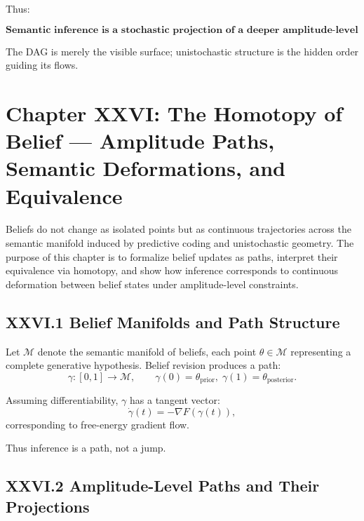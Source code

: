 \documentclass[12pt,letterpaper]{article}
\begin{document}
Thus:

\[
\boxed{
\textbf{Semantic inference is a stochastic projection of a deeper amplitude-level geometry.}
}
\]

The DAG is merely the visible surface;  
unistochastic structure is the hidden order guiding its flows.

\newpage

\section{Chapter XXVI: The Homotopy of Belief —  
Amplitude Paths, Semantic Deformations, and Equivalence}

Beliefs do not change as isolated points but as continuous trajectories across the semantic manifold induced by predictive coding and unistochastic geometry. The purpose of this chapter is to formalize belief updates as paths, interpret their equivalence via homotopy, and show how inference corresponds to continuous deformation between belief states under amplitude-level constraints.

\subsection{XXVI.1 Belief Manifolds and Path Structure}

Let $\mathcal{M}$ denote the semantic manifold of beliefs, each point $\theta \in \mathcal{M}$ representing a complete generative hypothesis. Belief revision produces a path:
\[
\gamma : [0,1] \to \mathcal{M}, \qquad \gamma(0)=\theta_{\text{prior}}, \; \gamma(1)=\theta_{\text{posterior}}.
\]

Assuming differentiability, $\gamma$ has a tangent vector:
\[
\dot{\gamma}(t) = -\nabla F(\gamma(t)),
\]
corresponding to free-energy gradient flow.

Thus inference is a path, not a jump.

\subsection{XXVI.2 Amplitude-Level Paths and Their Projections}
\end{document}
